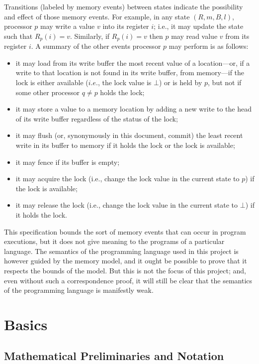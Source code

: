 \documentclass[11pt]{report}
\begin{document}
Transitions (labeled by memory events) between states indicate the possibility and effect of those memory events. For example, in any state $(R,m,B,l)$, processor $p$ may write a value $v$ into its register $i$; i.e., it may update the state such that $R_p(i) = v$. Similarly, if $R_p(i) = v$ then $p$ may read value $v$ from its register $i$. A summary of the other events processor $p$ may perform is as follows: \begin{itemize}
	\item it may load from its write buffer the most recent value of a location---or, if a write to that location is not found in its write buffer, from memory---if the lock is either available ($i.e.$, the lock value is $\bot$) or is held by $p$, but not if some other processor $q \neq p$ holds the lock;
	\item it may store a value to a memory location by adding a new write to the head of its write buffer regardless of the status of the lock; 
	\item it may flush (or, synonymously in this document, commit) the least recent write in its buffer to memory if it holds the lock or the lock is available;  
	\item it may fence if its buffer is empty;
	\item it may acquire the lock (i.e., change the lock value in the current state to $p$) if the lock is available; 
	\item it may release the lock (i.e., change the lock value in the current state to $\bot$) if it holds the lock.
\end{itemize}

This specification bounds the sort of memory events that can occur in program executions, but it does not give meaning to the programs of a particular language. The semantics of the programming language used in this project is however guided by the memory model, and it ought be possible to prove that it respects the bounds of the model. But this is not the focus of this project; and, even without such a correspondence proof, it will still be clear that the semantics of the programming language is manifestly weak. 

\chapter{Basics}
\label{ch:basics}

\section{Mathematical Preliminaries and Notation}
\end{document}
